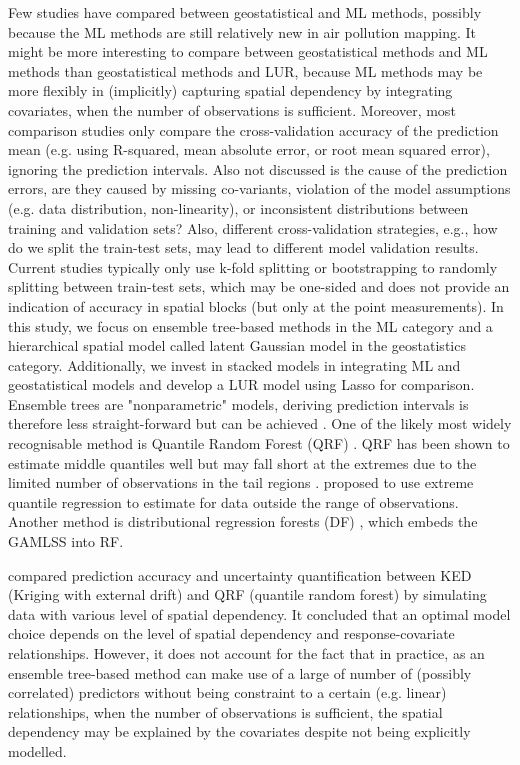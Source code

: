 \documentclass{article}
\begin{document}
Few studies have compared between geostatistical and ML methods, possibly because the ML methods are still relatively new in air pollution mapping. It might be more interesting to compare between geostatistical methods and ML methods than geostatistical methods and LUR, because ML methods may be more flexibly in (implicitly) capturing spatial dependency by integrating covariates, when the number of observations is sufficient. Moreover, most comparison studies only compare the cross-validation accuracy of the prediction mean (e.g. using R-squared, mean absolute error, or root mean squared error), ignoring the prediction intervals. Also not discussed is the cause of the prediction errors, are they caused by missing co-variants, violation of the model assumptions (e.g. data distribution, non-linearity), or inconsistent distributions between training and validation sets? Also, different cross-validation strategies, e.g., how do we split the train-test sets, may lead to different model validation results. Current studies typically only use k-fold splitting \citep{kerckhoffs2019performance,larkin2017global,REN2020105827} or bootstrapping \citep{luglobal} to randomly splitting between train-test sets, which may be one-sided and does not provide an indication of accuracy in spatial blocks (but only at the point measurements). In this study, we focus on ensemble tree-based methods in the ML category and a hierarchical spatial model \citep{lindgren2011explicit} called latent Gaussian model in the geostatistics category. Additionally, we invest in stacked models in integrating ML and geostatistical models and develop a LUR model using Lasso for comparison.  
Ensemble trees are "nonparametric" models, deriving prediction intervals is therefore less straight-forward but can be achieved \citep{meinshausen2006quantile,wager2014confidence,stasinopoulos2007generalized,velthoen2021gradient}. One of the likely most widely recognisable method is Quantile Random Forest (QRF) \citep{meinshausen2006quantile}. QRF has been shown to estimate middle quantiles well but may fall short at the extremes due to the limited number of observations in the tail regions \citep{velthoen2021gradient}. \cite{velthoen2021gradient} proposed to use extreme quantile regression to estimate for data outside the range of observations. Another method is distributional regression forests (DF) \citep{schlosser2019distributional}, which embeds the GAMLSS \citep{stasinopoulos2007generalized} into RF.  

\cite{fouedjio2019exploring} compared prediction accuracy and uncertainty quantification between KED (Kriging with external drift) and QRF (quantile random forest) \citep{meinshausen2006quantile} by simulating data with various level of spatial dependency. It concluded that an optimal model choice depends on the level of spatial dependency and response-covariate relationships. However, it does not account for the fact that in practice, as an ensemble tree-based method can make use of a large of number of (possibly correlated) predictors without being constraint to a certain (e.g. linear) relationships, when the number of observations is sufficient, the spatial dependency may be explained by the covariates despite not being explicitly modelled. 
\end{document}
